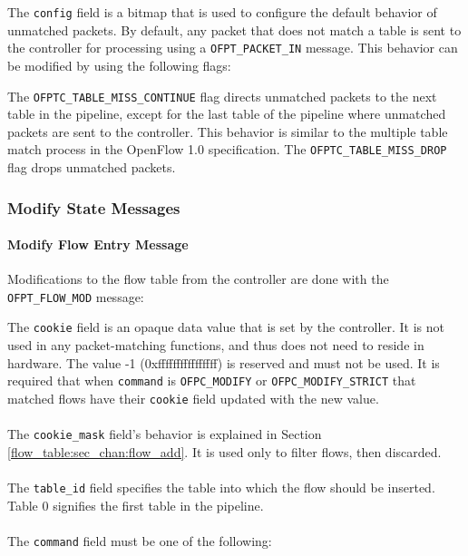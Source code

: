 The \verb|config| field is a bitmap that is used to configure the default behavior of unmatched packets.  By default, any packet that does not match a table is sent to the controller for processing using a \verb|OFPT_PACKET_IN| message.  This behavior can be modified by using the following flags:


The \verb|OFPTC_TABLE_MISS_CONTINUE| flag directs unmatched packets to the next table in the pipeline, except for the last table of the pipeline where unmatched packets are sent to the controller.  This behavior is similar to the multiple table match process in the OpenFlow 1.0 specification. The \verb|OFPTC_TABLE_MISS_DROP| flag drops unmatched packets.

\subsubsection{Modify State Messages}
\paragraph{Modify Flow Entry Message}
Modifications to the flow table from the controller are done with the \verb|OFPT_FLOW_MOD| message:


The \verb|cookie| field is an opaque data value that is set by the
controller.  It is not used in any packet-matching functions, and thus does
not need to reside in hardware.  The value -1 (0xffffffffffffffff) is
reserved and must not be used.  It is required that when \verb|command| is
\verb|OFPC_MODIFY| or \verb|OFPC_MODIFY_STRICT| that matched flows have
their \verb|cookie| field updated with the new value.
\\\\
The \verb|cookie_mask| field's behavior is explained in Section \ref{flow_table:sec_chan:flow_add}. It is used only to filter flows, then discarded.
\\\\
The \verb|table_id| field specifies the table into which the flow should be inserted.
Table 0 signifies the first table in the pipeline.
\\\\
The \verb|command| field must be one of the following:

